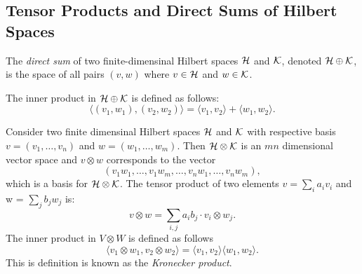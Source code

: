 \subsection {Tensor Products and Direct Sums of Hilbert Spaces}

\begin{definition}
  The \emph{direct sum} of two finite-dimensinal Hilbert spaces $\mathcal{H}$ and $\mathcal{K}$, denoted $\mathcal{H} \oplus \mathcal{K}$, is the space of all pairs $(v, w)$ where $v \in \mathcal{H}$ and $w \in \mathcal{K}$.
\end{definition}

The inner product in $\mathcal{H} \oplus \mathcal{K}$ is defined as follows:
\begin{equation*}
  \langle (v_1, w_1), (v_2, w_2) \rangle = \langle v_1, v_2 \rangle + \langle w_1, w_2 \rangle.
\end{equation*}



\begin{definition} \label{def:tensor_prod_fin_hilb}
Consider two finite dimensinal Hilbert spaces $\mathcal{H}$ and $\mathcal{K}$ with respective basis $v=(v_1, \ldots , v_n)$ and $w=(w_1, \ldots , w_m)$.  Then $\mathcal{H} \otimes \mathcal{K}$  is an $mn$ dimensional vector space and $v \otimes w$ corresponds to the vector
\[
(v_1 w_1, \ldots, v_1 w_m, \ldots, v_n w_1, \ldots, v_n w_m),
\]
which is a basis for  $\mathcal{H} \otimes \mathcal{K}$.  The tensor product of two elements $v = \sum_i a_i v_i$ and w = $\sum_j b_j  w_j$ is:
\begin{equation*}
  v \otimes w = \sum_{i,j} a_i b_j \cdot v_i \otimes w_j.
\end{equation*}
 The inner product in $V \otimes W$ is defined as follows 
\begin{equation*}
  \langle v_1 \otimes w_1, v_2 \otimes w_2 \rangle = \langle v_1, v_2 \rangle \langle w_1, w_2 \rangle.
\end{equation*}
This is definition is known as the \emph{Kronecker product}.
\end{definition}

